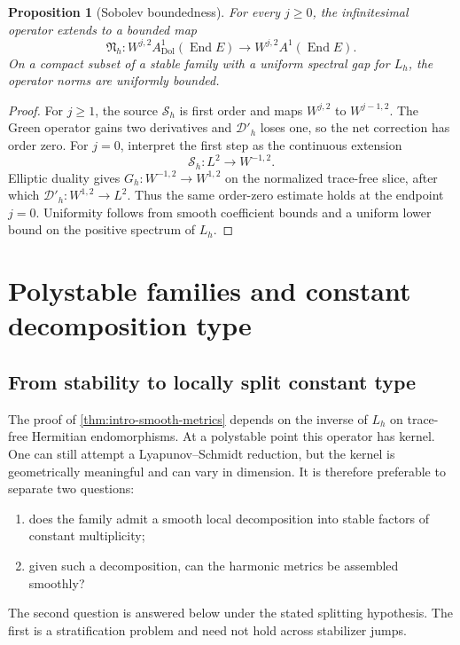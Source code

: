 \documentclass[11pt,reqno]{amsart}
\newtheorem{proposition}[theorem]{Proposition}
\theoremstyle{definition}
\theoremstyle{remark}
\newcommand{\cD}{\mathcal D}
\newcommand{\cS}{\mathcal S}
\newcommand{\End}{\operatorname{End}}
\newcommand{\Dol}{\mathrm{Dol}}
\begin{document}
\begin{proposition}[Sobolev boundedness]\label{prop:dnah-bounded}
For every $j\ge0$, the infinitesimal operator extends to a bounded map
\[
  \mathfrak N_h:W^{j,2}A^1_{\Dol}(\End E)\to W^{j,2}A^1(\End E).
\]
On a compact subset of a stable family with a uniform spectral gap for $L_h$, the operator norms are uniformly bounded.
\end{proposition}

\begin{proof}
For $j\ge1$, the source $\cS_h$ is first order and maps $W^{j,2}$ to $W^{j-1,2}$.  The Green operator gains two derivatives and $\cD'_h$ loses one, so the net correction has order zero.  For $j=0$, interpret the first step as the continuous extension
\[
  \cS_h:L^2\longrightarrow W^{-1,2}.
\]
Elliptic duality gives $G_h:W^{-1,2}\to W^{1,2}$ on the normalized trace-free slice, after which $\cD'_h:W^{1,2}\to L^2$.  Thus the same order-zero estimate holds at the endpoint $j=0$.  Uniformity follows from smooth coefficient bounds and a uniform lower bound on the positive spectrum of $L_h$.
\end{proof}

\section{Polystable families and constant decomposition type}\label{sec:poly}

\subsection{From stability to locally split constant type}

The proof of \cref{thm:intro-smooth-metrics} depends on the inverse of $L_h$ on trace-free Hermitian endomorphisms.  At a polystable point this operator has kernel.  One can still attempt a Lyapunov--Schmidt reduction, but the kernel is geometrically meaningful and can vary in dimension.  It is therefore preferable to separate two questions:
\begin{enumerate}[label=(\alph*)]
\item does the family admit a smooth local decomposition into stable factors of constant multiplicity;
\item given such a decomposition, can the harmonic metrics be assembled smoothly?
\end{enumerate}
The second question is answered below under the stated splitting hypothesis.  The first is a stratification problem and need not hold across stabilizer jumps.
\end{document}
